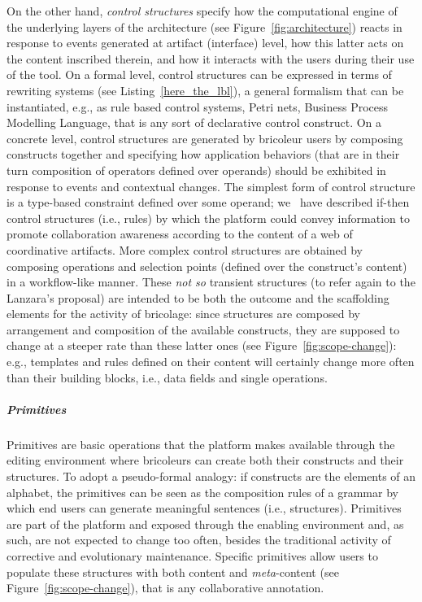 \documentclass{article}
\begin{document}
On the other hand, \emph{control structures} specify how the computational engine of the underlying layers of the architecture (see Figure~\ref{fig:architecture}) reacts in response to events generated at artifact (interface) level, how this latter acts on the content inscribed therein, and how it interacts with the users during their use of the tool. 
On a formal level, control structures can be expressed in terms of rewriting systems (see Listing~\ref{here_the_lbl}), a general formalism that can be instantiated, e.g., as rule based control systems, Petri nets, Business Process Modelling Language, that is any sort of declarative control construct. On a concrete level, control structures are generated by bricoleur users by composing constructs together and specifying how application behaviors (that are in their turn composition of operators defined over operands) should be exhibited in response to events and contextual changes. The simplest form of control structure is a type-based constraint defined over some operand; we~\citep{cabitza_leveraging_2009} have described if-then control structures (i.e., rules) by which the platform could convey information to promote collaboration awareness according to the content of a web of coordinative artifacts. More complex control structures are obtained by composing operations and selection points (defined over the construct's content) in a workflow-like manner. These \emph{not so} transient structures (to refer again to the Lanzara's proposal) are intended to be both the outcome and the scaffolding elements for the activity of bricolage: since structures are composed by arrangement and composition of the available constructs, they are supposed to change at a steeper rate than these latter ones (see Figure~\ref{fig:scope-change}): e.g., templates and rules defined on their content will certainly change more often than their building blocks, i.e., data fields and single operations.

\subparagraph{Primitives} Primitives are basic operations that the platform makes available through the editing environment where bricoleurs can create both their constructs and their structures. To adopt a pseudo-formal analogy: if constructs are the elements of an alphabet, the primitives can be seen as the composition rules of a grammar by which end users can generate meaningful sentences (i.e., structures). Primitives are part of the platform and exposed through the enabling environment and, as such, are not expected to change too often, besides the traditional activity of corrective and evolutionary maintenance. Specific primitives allow users to populate these structures with both content and \emph{meta}-content (see Figure~\ref{fig:scope-change}), that is any collaborative annotation.
\end{document}
